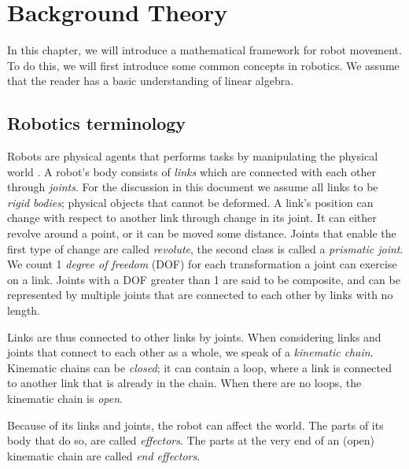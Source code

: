 \chapter{Background Theory} %
\label{ch:theory}

In this chapter, we will introduce a mathematical framework for robot
movement.  To do this, we will first introduce some common concepts in
robotics.  We assume that the reader has a basic understanding of linear
algebra.

\section{Robotics terminology}
\label{sec:robotics}

Robots are physical agents that performs tasks by manipulating the physical
world \cite[p.901]{Russel2003}.  A robot's body consists of
\emph{links} which are connected with each other through
\emph{joints}.  For the discussion in this document we assume all
links to be \emph{rigid bodies}; physical objects that
cannot be deformed.  A link's position can change with respect to another link
through change in its joint.  It can either revolve around a point, or it can
be moved some distance.  Joints that enable the first type of change are called
\emph{revolute}, the second class is called a
\emph{prismatic joint}.  We count 1 \emph{degree of
freedom} (DOF) for each transformation a
joint can exercise on a link.  Joints with a DOF greater than 1 are said to be
composite, and can be represented by multiple joints that are connected to
each other by links with no length.  

Links are thus connected to other links by joints.  When considering 
links and joints that connect to each other as a whole, we speak of a
\emph{kinematic chain}.  Kinematic chains can be
\emph{closed}; it can contain a loop, where a
link is connected to another link that is already in the chain.  When there
are no loops, the kinematic chain is \emph{open}.

Because of its links and joints, the robot can affect the world.  The parts of
its body that do so, are called \emph{effectors}.  The parts
at the very end of an (open) kinematic chain are called \emph{end
effectors}.

